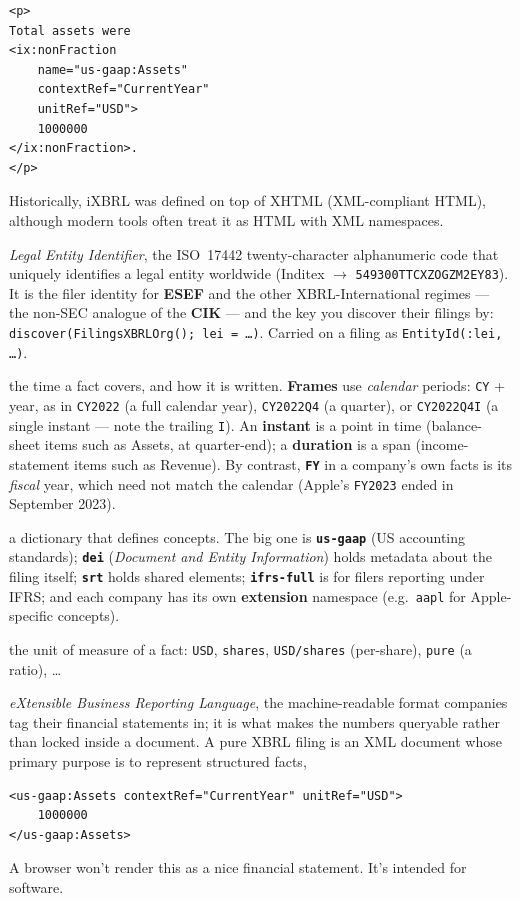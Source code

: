 \documentclass[11pt,a4paper]{report}
\begin{document}
\begin{description}[leftmargin=1.4em,style=nextline,itemsep=2pt]
\begin{lstlisting}
<p>
Total assets were
<ix:nonFraction
    name="us-gaap:Assets"
    contextRef="CurrentYear"
    unitRef="USD">
    1000000
</ix:nonFraction>.
</p>
\end{lstlisting}
Historically, iXBRL was defined on top of XHTML (XML-compliant HTML), although modern tools often treat it as HTML with XML namespaces.
  \item[LEI] \emph{Legal Entity Identifier}, the ISO~17442 twenty-character alphanumeric code that uniquely
    identifies a legal entity worldwide (Inditex $\to$ \texttt{549300TTCXZOGZM2EY83}). It is the filer identity
    for \textbf{ESEF} and the other XBRL-International regimes --- the non-SEC analogue of the \textbf{CIK} ---
    and the key you discover their filings by: \texttt{discover(FilingsXBRLOrg(); lei = \ldots)}. Carried on a
    filing as \texttt{EntityId(:lei, \ldots)}.
  \item[Period] the time a fact covers, and how it is written. \textbf{Frames}
    use \emph{calendar} periods: \texttt{CY} + year, as in \texttt{CY2022} (a full
    calendar year), \texttt{CY2022Q4} (a quarter), or \texttt{CY2022Q4I} (a single
    instant --- note the trailing \texttt{I}). An \textbf{instant} is a point in
    time (balance-sheet items such as Assets, at quarter-end); a
    \textbf{duration} is a span (income-statement items such as Revenue). By
    contrast, \textbf{\texttt{FY}} in a company's own facts is its \emph{fiscal}
    year, which need not match the calendar (Apple's \texttt{FY2023} ended in
    September 2023).
  \item[Taxonomy] a dictionary that defines concepts. The big one is
    \textbf{\texttt{us-gaap}} (US accounting standards); \textbf{\texttt{dei}}
    (\emph{Document and Entity Information}) holds metadata about the filing
    itself; \textbf{\texttt{srt}} holds shared elements; \textbf{\texttt{ifrs-full}}
    is for filers reporting under IFRS; and each company has its own
    \textbf{extension} namespace (e.g.\ \texttt{aapl} for Apple-specific concepts).
  \item[Unit] the unit of measure of a fact: \texttt{USD}, \texttt{shares},
    \texttt{USD/shares} (per-share), \texttt{pure} (a ratio), \dots
  \item[XBRL] \emph{eXtensible Business Reporting Language}, the machine-readable format companies tag their financial statements in; it is what makes the numbers queryable rather than locked inside a document. A pure XBRL filing is an XML document whose primary purpose is to represent structured facts,
  \begin{lstlisting}
<us-gaap:Assets contextRef="CurrentYear" unitRef="USD">
    1000000
</us-gaap:Assets>
\end{lstlisting}
A browser won't render this as a nice financial statement. It's intended for software.
\end{description}
\end{document}

